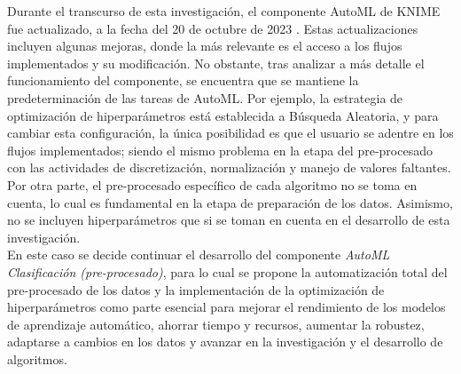 \begin{table}[H]
\end{table}

Durante el transcurso de esta investigación, el componente AutoML de KNIME fue actualizado, a la fecha del 20 de octubre de 2023 \citep{KNIME2023-11}. Estas actualizaciones incluyen algunas mejoras, donde la más relevante es el acceso a los flujos implementados y su modificación. No obstante, tras analizar a más detalle el funcionamiento del componente, se encuentra que se mantiene la predeterminación de las tareas de AutoML. Por ejemplo, la estrategia de optimización de hiperparámetros está establecida a Búsqueda Aleatoria, y para cambiar esta configuración, la única posibilidad es que el usuario se adentre en los flujos implementados; siendo el mismo problema en la etapa del pre-procesado con las actividades de discretización, normalización y manejo de valores faltantes. Por otra parte, el pre-procesado específico de cada algoritmo no se toma en cuenta, lo cual es fundamental en la etapa de preparación de los datos. Asimismo, no se incluyen hiperparámetros que si se toman en cuenta en el desarrollo de esta investigación. \\
En este caso se decide continuar el desarrollo del componente \textit{AutoML Clasificación (pre-procesado)}, para lo cual se propone la automatización total del pre-procesado de los datos y la implementación de la optimización de hiperparámetros como parte esencial para mejorar el rendimiento de los modelos de aprendizaje automático, ahorrar tiempo y recursos, aumentar la robustez, adaptarse a cambios en los datos y avanzar en la investigación y el desarrollo de algoritmos.



